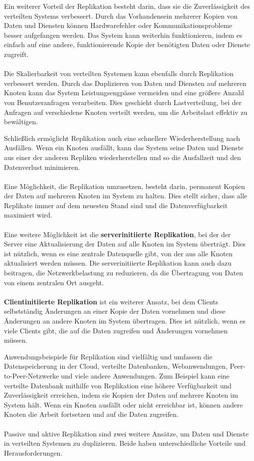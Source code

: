 \documentclass[../vs-script-first-v01.tex]{subfiles}
\begin{document}
Ein weiterer Vorteil der Replikation besteht darin, dass sie die Zuverlässigkeit des verteilten Systems verbessert. Durch das Vorhandensein mehrerer Kopien von Daten und Diensten können Hardwarefehler oder Kommunikationsprobleme besser aufgefangen werden. Das System kann weiterhin funktionieren, indem es einfach auf eine andere, funktionierende Kopie der benötigten Daten oder Dienste zugreift.
\\\\
Die Skalierbarkeit von verteilten Systemen kann ebenfalls durch Replikation verbessert werden. Durch das Duplizieren von Daten und Diensten auf mehreren Knoten kann das System Leistungsengpässe vermeiden und eine größere Anzahl von Benutzeranfragen verarbeiten. Dies geschieht durch Lastverteilung, bei der Anfragen auf verschiedene Knoten verteilt werden, um die Arbeitslast effektiv zu bewältigen.

Schließlich ermöglicht Replikation auch eine schnellere Wiederherstellung nach Ausfällen. Wenn ein Knoten ausfällt, kann das System seine Daten und Dienste aus einer der anderen Repliken wiederherstellen und so die Ausfallzeit und den Datenverlust minimieren.
\\\\
Eine Möglichkeit, die Replikation umzusetzen, besteht darin, permanent Kopien der Daten auf mehreren Knoten im System zu halten. Dies stellt sicher, dass alle Replikate immer auf dem neuesten Stand sind und die Datenverfügbarkeit maximiert wird.
\\\\
Eine weitere Möglichkeit ist die \textbf{serverinitiierte Replikation}, bei der der Server eine Aktualisierung der Daten auf alle Knoten im System überträgt. Dies ist nützlich, wenn es eine zentrale Datenquelle gibt, von der aus alle Knoten aktualisiert werden müssen. Die serverinitiierte Replikation kann auch dazu beitragen, die Netzwerkbelastung zu reduzieren, da die Übertragung von Daten von einem zentralen Ort ausgeht.
\\\\
\textbf{Clientinitiierte Replikation} ist ein weiterer Ansatz, bei dem Clients selbstständig Änderungen an einer Kopie der Daten vornehmen und diese Änderungen an andere Knoten im System übertragen. Dies ist nützlich, wenn es viele Clients gibt, die auf die Daten zugreifen und Änderungen vornehmen müssen.

Anwendungsbeispiele für Replikation sind vielfältig und umfassen die Datenspeicherung in der Cloud, verteilte Datenbanken, Webanwendungen, Peer-to-Peer-Netzwerke und viele andere Anwendungen. Zum Beispiel kann eine verteilte Datenbank mithilfe von Replikation eine höhere Verfügbarkeit und Zuverlässigkeit erreichen, indem sie Kopien der Daten auf mehrere Knoten im System hält. Wenn ein Knoten ausfällt oder nicht erreichbar ist, können andere Knoten die Arbeit fortsetzen und auf die Daten zugreifen.
\\\\
Passive und aktive Replikation sind zwei weitere Ansätze, um Daten und Dienste in verteilten Systemen zu duplizieren. Beide haben unterschiedliche Vorteile und Herausforderungen.
\end{document}
